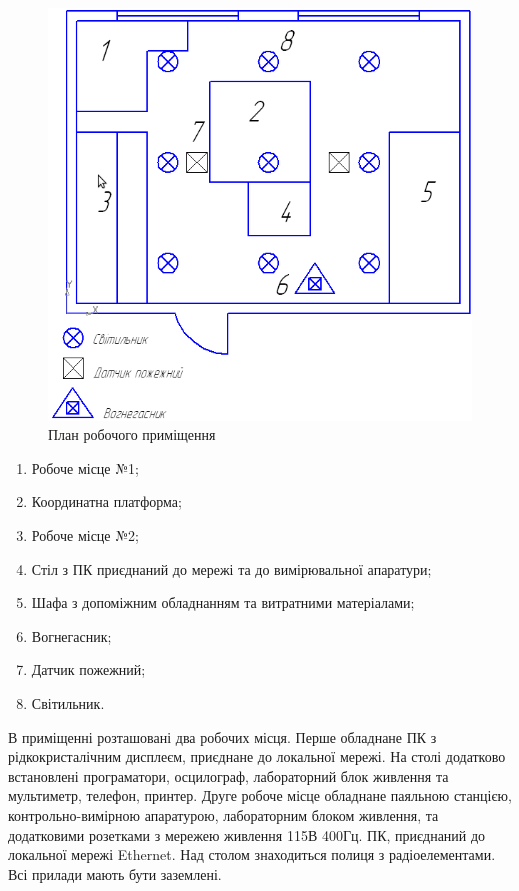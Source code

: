 \documentclass[ukrainian,utf8,simple,floatsubsection, hpadding=5mm,equationsubsection,]{eskdtext}
\begin{document}
\begin{figure}[H]
\centering
\includegraphics[scale=0.6]{lab_plan}
\caption{План робочого приміщення}\label{fig:lab_plan}
\end{figure}

\begin{enumerate}
 \item Робоче місце №1;
 \item Координатна платформа;
 \item Робоче місце №2;
 \item Стіл з ПК приєднаний до мережі та до вимірювальної апаратури;
 \item Шафа з допоміжним обладнанням та витратними матеріалами;
 \item Вогнегасник;
 \item Датчик пожежний;
 \item Світильник.
\end{enumerate}

В приміщенні розташовані два робочих місця. Перше обладнане ПК з рідкокристалічним дисплеєм, приєднане до локальної мережі. На столі додатково встановлені програматори, осцилограф, лабораторний блок живлення та мультиметр, телефон, принтер. Друге робоче місце обладнане паяльною станцією, контрольно-вимірною апаратурою, лабораторним блоком живлення, та додатковими розетками з мережею живлення 115В 400Гц. ПК, приєднаний до локальної мережі Ethernet. Над столом знаходиться полиця з радіоелементами. Всі прилади мають бути заземлені.
\end{document}
